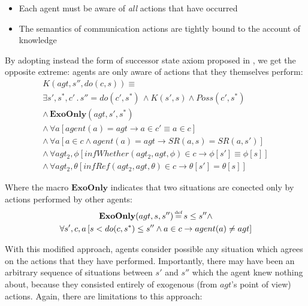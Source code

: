 \documentclass[letterpaper]{article}
\newcommand{\isdef}{\hbox{$\stackrel{\mbox{\tiny def}}{=}$}}
\begin{document}
\begin{itemize}
\item Each agent must be aware of \emph{all} actions that have occurred 
\item The semantics of communication actions are tightly bound to the account
of knowledge 
\end{itemize}
By adopting instead the form of successor state axiom proposed in
\cite{Lesperance99sitcalc_approach}, we get the opposite extreme:
agents are only aware of actions that they themselves perform:
\begin{multline}
K(agt,s'',do(c,s))\equiv\\
\exists s',s^{*},c'\,.\, s''=do(c',s^{*})\,\wedge K(s',s)\wedge Poss(c',s^{*})\\
\wedge\,\mathbf{ExoOnly}(agt,s',s^{*})\\
\wedge\,\forall a\left[agent(a)=agt\rightarrow a\in c'\equiv a\in c\right]\\
\wedge\,\forall a\left[a\in c\wedge agent(a)=agt\rightarrow SR(a,s)=SR(a,s')\right]\\
\wedge\,\forall agt_{2},\phi\left[infWhether(agt_{2},agt,\phi)\in c\rightarrow\phi[s']\equiv\phi[s]\right]\\
\wedge\,\forall agt_{2},\theta\left[infRef(agt_{2},agt,\theta)\in c\rightarrow\theta[s']=\theta[s]\right]
\end{multline}


Where the macro $\mathbf{ExoOnly}$ indicates that two situations
are conected only by actions performed by other agents:
\begin{multline}
\mathbf{ExoOnly}(agt,s,s'')\,\isdef\, s\leq s''\wedge\\
\forall s',c,a\left[s<do(c,s^{*})\leq s'' \wedge a\in c \rightarrow agent(a)\neq agt\right]
\end{multline}

With this modified approach, agents consider possible any situation
which agrees on the actions that they have performed. Importantly,
there may have been an arbitrary sequence of situations between $s'$
and $s''$ which the agent knew nothing about, because they consisted
entirely of exogenous (from $agt$'s point of view) actions. Again,
there are limitations to this approach:
\end{document}
